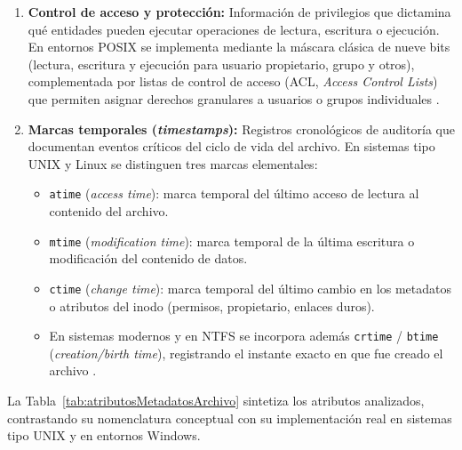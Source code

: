 \documentclass[12pt]{article}
\begin{document}
\begin{enumerate}[noitemsep, topsep=2pt]
    \item \textbf{Control de acceso y protección:} Información de privilegios que dictamina qué entidades pueden ejecutar operaciones de lectura, escritura o ejecución. En entornos POSIX se implementa mediante la máscara clásica de nueve bits (lectura, escritura y ejecución para usuario propietario, grupo y otros), complementada por listas de control de acceso (ACL, \textit{Access Control Lists}) que permiten asignar derechos granulares a usuarios o grupos individuales \parencite[\S 12.1, pp.\ 552--553]{stallings2018operating}.
    \item \textbf{Marcas temporales (\textit{timestamps}):} Registros cronológicos de auditoría que documentan eventos críticos del ciclo de vida del archivo. En sistemas tipo UNIX y Linux se distinguen tres marcas elementales:
    \begin{itemize}[noitemsep, topsep=1pt]
        \item \texttt{atime} (\textit{access time}): marca temporal del último acceso de lectura al contenido del archivo.
        \item \texttt{mtime} (\textit{modification time}): marca temporal de la última escritura o modificación del contenido de datos.
        \item \texttt{ctime} (\textit{change time}): marca temporal del último cambio en los metadatos o atributos del inodo (permisos, propietario, enlaces duros).
        \item En sistemas modernos y en NTFS se incorpora además \texttt{crtime} / \texttt{btime} (\textit{creation/birth time}), registrando el instante exacto en que fue creado el archivo \parencite[\S 8.2.1, p.\ 423]{carretero2001sistemas}.
    \end{itemize}
\end{enumerate}

La Tabla~\ref{tab:atributosMetadatosArchivo} sintetiza los atributos analizados, contrastando su nomenclatura conceptual con su implementación real en sistemas tipo UNIX y en entornos Windows.
\end{document}
